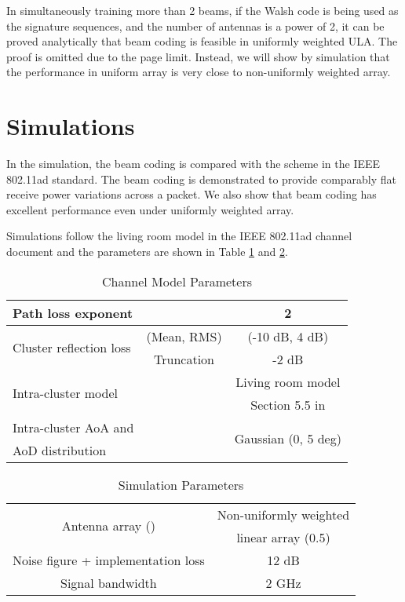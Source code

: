 \documentclass[10pt,conference]{IEEEtran}
\begin{document}
In simultaneously training more than 2 beams, if the Walsh code is being used
as the signature sequences, and
the number of antennas is a power of 2, it can be proved analytically that beam coding is feasible in uniformly weighted ULA. The proof is omitted due
to the page limit. Instead, we will show by simulation that the performance in uniform array is very close to non-uniformly weighted array.






\section{Simulations}
In the simulation, the beam coding is compared with the scheme in the IEEE 802.11ad standard. The beam coding is demonstrated to provide comparably flat receive power variations across a packet.
We also show that beam coding has excellent performance even under uniformly weighted array.

Simulations follow the living room model in the
IEEE 802.11ad channel document
\cite{maltsec10} and the parameters are shown in Table \ref{tab:channel} and \ref{tab:simulation}.

\begin{table}
\centering
\begin{small}
\caption{Channel Model Parameters}
\vspace{-5pt}
\begin{tabular}{lcc} \hline
Path loss exponent & & 2 \\ \hline
\multirow{2}{*}{Cluster reflection loss} & (Mean, RMS) & (-10 dB, 4 dB) \\
& Truncation & -2 dB \\ \hline
\multirow{2}{*}{Intra-cluster model}& &Living room model \\
& & Section 5.5 in \cite{maltsec10}\\\hline
Intra-cluster AoA and & &\multirow{2}{*}{Gaussian (0, 5 deg)}  \\
AoD distribution & & \\\hline
\end{tabular}\label{tab:channel}
\end{small}
\end{table}
\begin{table}
\centering
\begin{small}
\vspace{+5pt}
\caption{Simulation Parameters}
\vspace{-5pt}
\begin{tabular}{cc} \hline
\multirow{2}{*}{Antenna array ()} & Non-uniformly weighted\\
& linear array (0.5)\\\hline
Noise figure + implementation loss & 12 dB \\ \hline
Signal bandwidth & 2 GHz \\\hline
\end{tabular}\label{tab:simulation}
\end{small}
\vspace{-15pt}
\end{table}
\end{document}

